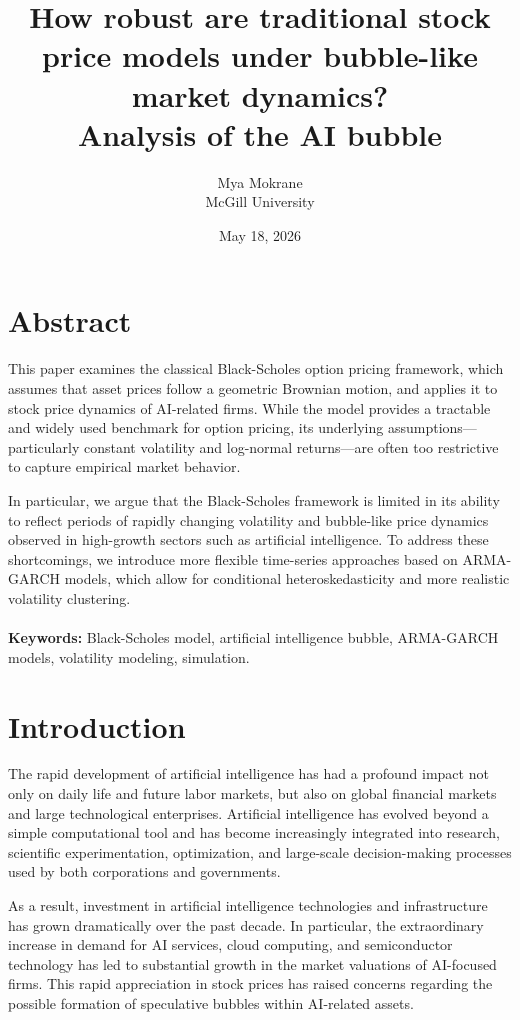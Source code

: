 \documentclass{article}
\title{How robust are traditional stock price models under bubble-like market dynamics?\\Analysis of the AI bubble}
\author{Mya Mokrane\\McGill University}
\date{May 18, 2026}
\begin{document}
\maketitle
\tableofcontents 


\section*{Abstract}

This paper examines the classical Black-Scholes option pricing framework, which assumes that asset prices follow a geometric Brownian motion, and applies it to stock price dynamics of AI-related firms. While the model provides a tractable and widely used benchmark for option pricing, its underlying assumptions—particularly constant volatility and log-normal returns—are often too restrictive to capture empirical market behavior.

In particular, we argue that the Black-Scholes framework is limited in its ability to reflect periods of rapidly changing volatility and bubble-like price dynamics observed in high-growth sectors such as artificial intelligence. To address these shortcomings, we introduce more flexible time-series approaches based on ARMA-GARCH models, which allow for conditional heteroskedasticity and more realistic volatility clustering.
\\
\\
\textbf{Keywords:} Black-Scholes model, artificial intelligence bubble, ARMA-GARCH models, volatility modeling, simulation.
\newpage

\section*{Introduction}

  The rapid development of artificial intelligence has had a profound impact not only on daily life and future labor markets, but also on global financial markets and large technological enterprises. Artificial intelligence has evolved beyond a simple computational tool and has become increasingly integrated into research, scientific experimentation, optimization, and large-scale decision-making processes used by both corporations and governments.

  As a result, investment in artificial intelligence technologies and infrastructure has grown dramatically over the past decade. In particular, the extraordinary increase in demand for AI services, cloud computing, and semiconductor technology has led to substantial growth in the market valuations of AI-focused firms. This rapid appreciation in stock prices has raised concerns regarding the possible formation of speculative bubbles within AI-related assets.
  
\end{document}
